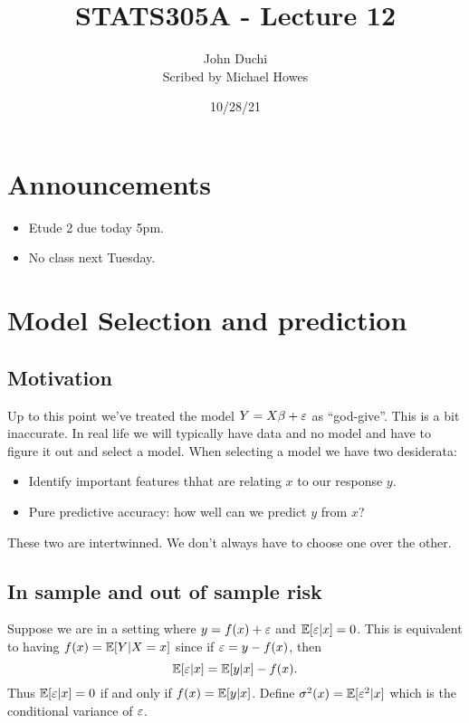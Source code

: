 

\DeclareMathOperator*{\bias}{Bias}


\title{STATS305A - Lecture 12}
\author{John Duchi\\ Scribed by Michael Howes}
\date{10/28/21}

\pagestyle{fancy}
\fancyhf{}


\maketitle
\tableofcontents
\section{Announcements}
\begin{itemize}
    \item Etude 2 due today 5pm.
    \item No class next Tuesday.
\end{itemize}
\section{Model Selection and prediction}
\subsection{Motivation}
Up to this point we've treated the model $Y=X\beta + \varepsilon$ as ``god-give''. This is a bit inaccurate. In real life we will typically have data and no model and have to figure it out and select a model. When selecting a model we have two desiderata:
\begin{itemize}
    \item Identify important features thhat are relating $x$ to our response $y$.
    \item Pure predictive accuracy: how well can we predict $y$ from $x$?
\end{itemize}
These two are intertwinned. We don't always have to choose one over the other.
\subsection{In sample and out of sample risk}
Suppose we are in a setting where $y = f(x)+\varepsilon$ and ${\mathbb{E}}[\varepsilon|x]=0$. This is equivalent to having $f(x) = {\mathbb{E}}[Y|X=x]$ since if $\varepsilon = y-f(x)$, then \[{\mathbb{E}}[\varepsilon|x] = {\mathbb{E}}[y|x] - f(x).\]
Thus ${\mathbb{E}}[\varepsilon|x]=0$ if and only if $f(x) = {\mathbb{E}}[y|x]$. Define $\sigma^2(x) = {\mathbb{E}}[\varepsilon^2|x]$ which is the conditional variance of $\varepsilon$. 

